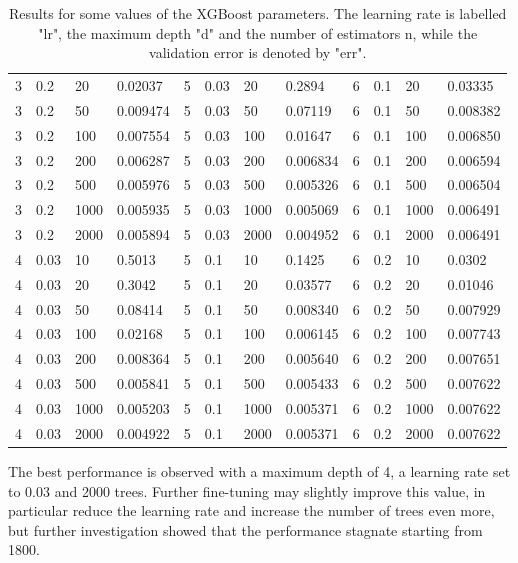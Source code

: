 \begin{table}[h!]
\begin{tabular}{|l|l|l|l||l|l|l|l||l|l|l|l|}
        3 & 0.2  & 20   & 0.02037  &  5 & 0.03 & 20   & 0.2894   & 6 & 0.1  & 20   & 0.03335  \\
        3 & 0.2  & 50   & 0.009474 &  5 & 0.03 & 50   & 0.07119  & 6 & 0.1  & 50   & 0.008382 \\
        3 & 0.2  & 100  & 0.007554 &  5 & 0.03 & 100  & 0.01647  & 6 & 0.1  & 100  & 0.006850 \\
        3 & 0.2  & 200  & 0.006287 &  5 & 0.03 & 200  & 0.006834 & 6 & 0.1  & 200  & 0.006594 \\
        3 & 0.2  & 500  & 0.005976 &  5 & 0.03 & 500  & 0.005326 & 6 & 0.1  & 500  & 0.006504 \\
        3 & 0.2  & 1000 & 0.005935 &  5 & 0.03 & 1000 & 0.005069 & 6 & 0.1  & 1000 & 0.006491 \\
        3 & 0.2  & 2000 & 0.005894 &  5 & 0.03 & 2000 & 0.004952 & 6 & 0.1  & 2000 & 0.006491 \\
        4 & 0.03 & 10   & 0.5013   &  5 & 0.1  & 10   & 0.1425   & 6 & 0.2  & 10   & 0.0302   \\
        4 & 0.03 & 20   & 0.3042   &  5 & 0.1  & 20   & 0.03577  & 6 & 0.2  & 20   & 0.01046  \\
        4 & 0.03 & 50   & 0.08414  &  5 & 0.1  & 50   & 0.008340 & 6 & 0.2  & 50   & 0.007929 \\
        4 & 0.03 & 100  & 0.02168  &  5 & 0.1  & 100  & 0.006145 & 6 & 0.2  & 100  & 0.007743 \\
        4 & 0.03 & 200  & 0.008364 &  5 & 0.1  & 200  & 0.005640 & 6 & 0.2  & 200  & 0.007651 \\
        4 & 0.03 & 500  & 0.005841 &  5 & 0.1  & 500  & 0.005433 & 6 & 0.2  & 500  & 0.007622 \\
        4 & 0.03 & 1000 & 0.005203 &  5 & 0.1  & 1000 & 0.005371 & 6 & 0.2  & 1000 & 0.007622 \\
        4 & 0.03 & 2000 & 0.004922 &  5 & 0.1  & 2000 & 0.005371 & 6 & 0.2  & 2000 & 0.007622 \\
    \end{tabular}
    \caption{Results for some values of the XGBoost parameters. The learning rate is labelled "lr", the maximum depth "d" and the number of estimators n, while the validation error is denoted by "err".}
    \label{tab:results-xgboost}
\end{table}

The best performance is observed with a maximum depth of 4, a learning rate set to 0.03 and 2000 trees. Further fine-tuning may slightly improve this value, in particular reduce the learning rate and increase the number of trees even more, but further investigation showed that the performance stagnate starting from 1800.

